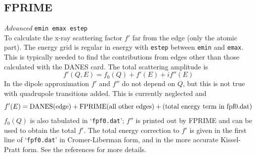 \documentclass[11pt,oneside]{report} %
\newenvironment{Card}[4]%
      {\vspace{3ex}%
        \subsection{#1}
        \quad\textsl{#3}\newline
        \quad\texttt{#2}\newline%
        \label{card:#4}\\}
      {}
\newcommand{\file}[1]{`\texttt{#1}'}
\begin{document}
\begin{Card}{FPRIME}{emin emax estep}{Advanced}{fpr}
  To calculate the x-ray scattering factor $f'$ far from the edge
  (only the atomic part). The energy grid is regular in energy with \texttt{estep} 
  between \texttt{emin} and \texttt{emax}. This is typically needed to find 
  the contributions from edges other than those calculated with the DANES card. 
  The total scattering amplitude is $$f'(Q,E) = f_0(Q) + f'(E) +if''(E)$$
  In the dipole approximation $f'$ and $f''$ do not depend on $Q$, but
  this is not true with quadrupole transitions added. This is currently 
  neglected
  and $$f'(E)={\rm DANES(edge)+FPRIME(all\ other\ edges) + (total\ energy\ term\ in\ fpf0.dat)}$$
  $f_0(Q)$ is also tabulated in \file{fpf0.dat};
  $f''$ is printed out by FPRIME and can be used to obtain the total $f'$.
  The total energy correction to $f'$ is given in the first line of
  \file{fpf0.dat} in Cromer-Liberman form, and in the more accurate Kissel-Pratt 
  form. See the references for more details.
\end{Card}
\end{document}

